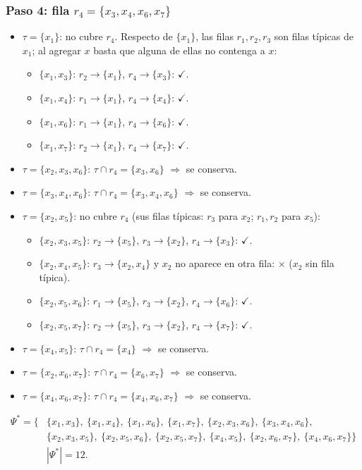 \documentclass[11pt, a4paper]{article}
\theoremstyle{definition}
\theoremstyle{plain}
\newcommand{\Psis}{\Psi^{*}}
\newcommand{\x}[1]{x_{#1}}
\newcommand{\cj}[1]{\{#1\}}
\newcommand{\si}{\textcolor{green!50!black}{\ensuremath{\checkmark}}}
\newcommand{\no}{\textcolor{red!70!black}{\ensuremath{\times}}}
\begin{document}
\subsubsection*{Paso 4: fila $r_4=\cj{\x3,\x4,\x6,\x7}$}
\begin{itemize}[nosep]
\item $\tau=\cj{\x1}$: no cubre $r_4$. Respecto de $\cj{\x1}$, las filas $r_1,r_2,r_3$ son filas típicas de $\x1$; al agregar $x$ basta que alguna de ellas no contenga a $x$:
  \begin{itemize}[nosep]
  \item $\cj{\x1,\x3}$: $r_2\to\cj{\x1}$, $r_4\to\cj{\x3}$: \si.
  \item $\cj{\x1,\x4}$: $r_1\to\cj{\x1}$, $r_4\to\cj{\x4}$: \si.
  \item $\cj{\x1,\x6}$: $r_1\to\cj{\x1}$, $r_4\to\cj{\x6}$: \si.
  \item $\cj{\x1,\x7}$: $r_2\to\cj{\x1}$, $r_4\to\cj{\x7}$: \si.
  \end{itemize}
\item $\tau=\cj{\x2,\x3,\x6}$: $\tau\cap r_4=\cj{\x3,\x6}$ $\Rightarrow$ se conserva.
\item $\tau=\cj{\x3,\x4,\x6}$: $\tau\cap r_4=\cj{\x3,\x4,\x6}$ $\Rightarrow$ se conserva.
\item $\tau=\cj{\x2,\x5}$: no cubre $r_4$ (sus filas típicas: $r_3$ para $\x2$; $r_1,r_2$ para $\x5$):
  \begin{itemize}[nosep]
  \item $\cj{\x2,\x3,\x5}$: $r_2\to\cj{\x5}$, $r_3\to\cj{\x2}$, $r_4\to\cj{\x3}$: \si.
  \item $\cj{\x2,\x4,\x5}$: $r_3\to\cj{\x2,\x4}$ y $\x2$ no aparece en otra fila: \no{} ($\x2$ sin fila típica).
  \item $\cj{\x2,\x5,\x6}$: $r_1\to\cj{\x5}$, $r_3\to\cj{\x2}$, $r_4\to\cj{\x6}$: \si.
  \item $\cj{\x2,\x5,\x7}$: $r_2\to\cj{\x5}$, $r_3\to\cj{\x2}$, $r_4\to\cj{\x7}$: \si.
  \end{itemize}
\item $\tau=\cj{\x4,\x5}$: $\tau\cap r_4=\cj{\x4}$ $\Rightarrow$ se conserva.
\item $\tau=\cj{\x2,\x6,\x7}$: $\tau\cap r_4=\cj{\x6,\x7}$ $\Rightarrow$ se conserva.
\item $\tau=\cj{\x4,\x6,\x7}$: $\tau\cap r_4=\cj{\x4,\x6,\x7}$ $\Rightarrow$ se conserva.
\end{itemize}
\[
\begin{aligned}
\Psis=\big\{&\cj{\x1,\x3},\ \cj{\x1,\x4},\ \cj{\x1,\x6},\ \cj{\x1,\x7},\ \cj{\x2,\x3,\x6},\ \cj{\x3,\x4,\x6},\\
&\cj{\x2,\x3,\x5},\ \cj{\x2,\x5,\x6},\ \cj{\x2,\x5,\x7},\ \cj{\x4,\x5},\ \cj{\x2,\x6,\x7},\ \cj{\x4,\x6,\x7}\big\}\\
&|\Psis|=12.
\end{aligned}
\]
\end{document}
